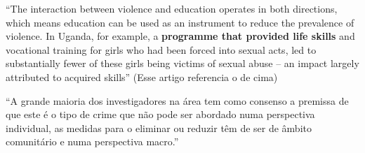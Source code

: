 ``The interaction between violence and education operates in both directions, which means education can be used as an instrument to reduce the prevalence of violence. In Uganda, for example, a \textbf{programme that provided life skills} and vocational training for girls who had been forced into sexual acts, led to substantially fewer of these girls being victims of sexual abuse – an impact largely attributed to acquired skills''  \cite{owidviolenceagainstrightsforchildren} (Esse artigo referencia o de cima)


``A grande maioria dos investigadores na área tem como consenso a premissa de que este é o tipo de crime que não pode ser abordado numa perspectiva individual, as medidas para o eliminar ou reduzir têm de ser de âmbito comunitário e numa perspectiva macro.''\cite{maria2010papel}

